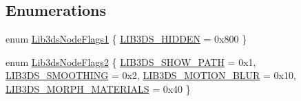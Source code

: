 \subsection*{Enumerations}
\begin{DoxyCompactItemize}
\item 
enum \hyperlink{group__node_ga91c70cef0987f62c000e796e8875653d}{Lib3ds\-Node\-Flags1} \{ \hyperlink{group__node_gga91c70cef0987f62c000e796e8875653dadc5e55b8eefb7a574414782f7ebca8e0}{L\-I\-B3\-D\-S\-\_\-\-H\-I\-D\-D\-E\-N} = 0x800
 \}
\item 
enum \hyperlink{group__node_ga3d1ef4a81bac490b9f516164e8958d02}{Lib3ds\-Node\-Flags2} \{ \hyperlink{group__node_gga3d1ef4a81bac490b9f516164e8958d02a7cce7750d91fd04f2fc95ff8f7254114}{L\-I\-B3\-D\-S\-\_\-\-S\-H\-O\-W\-\_\-\-P\-A\-T\-H} = 0x1, 
\hyperlink{group__node_gga3d1ef4a81bac490b9f516164e8958d02a52d4f13302dbdf76b52c1ecad790e9f3}{L\-I\-B3\-D\-S\-\_\-\-S\-M\-O\-O\-T\-H\-I\-N\-G} = 0x2, 
\hyperlink{group__node_gga3d1ef4a81bac490b9f516164e8958d02a5b35cbfe7a061a24bbc178110f5c6883}{L\-I\-B3\-D\-S\-\_\-\-M\-O\-T\-I\-O\-N\-\_\-\-B\-L\-U\-R} = 0x10, 
\hyperlink{group__node_gga3d1ef4a81bac490b9f516164e8958d02a9651d5cee19b2906adf1220af7235336}{L\-I\-B3\-D\-S\-\_\-\-M\-O\-R\-P\-H\-\_\-\-M\-A\-T\-E\-R\-I\-A\-L\-S} = 0x40
 \}
\end{DoxyCompactItemize}
